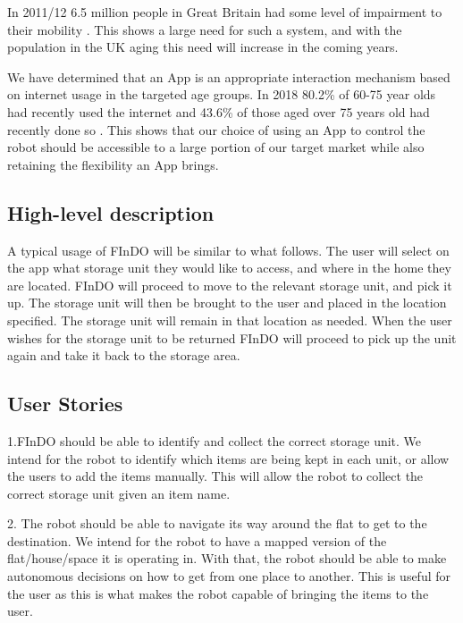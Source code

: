 \documentclass{article}
\begin{document}
In 2011/12 6.5 million people in Great Britain had some level of impairment to their mobility \cite{disabilitystats}. This shows a large need for such a system, and with the population in the UK aging \cite{agegrowth} this need will increase in the coming years.

We have determined that an App is an appropriate interaction mechanism based on internet usage in the targeted age groups. In 2018 80.2\% of 60-75 year olds had recently used the internet and 43.6\% of those aged over 75 years old had recently done so \cite{webage}. This shows that our choice of using an App to control the robot should be accessible to a large portion of our target market while also retaining the flexibility an App brings.

\subsection{High-level description} 
A typical usage of FInDO will be similar to what follows. The user will select on the app what storage unit they would like to access, and where in the home they are located. FInDO will proceed to move to the relevant storage unit, and pick it up. The storage unit will then be  brought to the user and placed in the location specified. The storage unit will remain in that location as needed. When the user wishes for the storage unit to be returned FInDO will proceed to pick up the unit again and take it back to the  storage area.

\subsection{User Stories}

1.FInDO should be able to identify and collect the correct storage unit. We intend for the robot to identify which items are being kept in each unit, or allow the users to add the items manually. This will allow the robot to collect the correct storage unit given an item name. 

2. The robot should be able to navigate its way around the flat to get to the destination. We intend for the robot to have a mapped version of the flat/house/space it is operating in. With that, the robot should be able to make autonomous decisions on how to get from one place to another. This is useful for the user as this is what makes the robot capable of bringing the items to the user.
\end{document}
